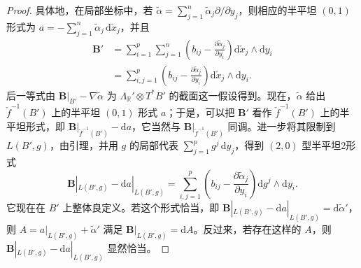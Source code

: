 \begin{proof}
具体地，在局部坐标中，若 $\widetilde\alpha=\sum_{j=1}^n\widetilde\alpha_j\partial/\partial y_j$，则相应的半平坦 $(0,1)$ 形式为 $a=-\sum_{j=1}^n\widetilde\alpha_j\,\mathrm d\check x_j$，并且
\begin{equation}\label{eq:6.4}
\begin{aligned}
\mathbf B'
&=\sum_{i=1}^p\sum_{j=1}^n
\left(b_{ij}-\frac{\partial\widetilde\alpha_j}{\partial y_i}\right)
\mathrm d\check x_j\wedge\mathrm dy_i\\
&=\sum_{i,j=1}^p
\left(b_{ij}-\frac{\partial\widetilde\alpha_j}{\partial y_i}\right)
\mathrm d\check x_j\wedge\mathrm dy_i.
\end{aligned}
\end{equation}
后一等式由 $\mathbf B|_{B'}-\nabla\widetilde\alpha$ 为 $\Lambda_{\mathbb R}'\otimes T^*B'$ 的截面这一假设得到。现在，$\widetilde\alpha$ 给出 $\check f^{-1}(B')$ 上的半平坦 $(0,1)$ 形式 $a$；于是，可以把 $\mathbf B'$ 看作 $\check f^{-1}(B')$ 上的半平坦形式，即 $\mathbf B|_{\check f^{-1}(B')}-\mathrm da$，它当然与 $\mathbf B|_{\check f^{-1}(B')}$ 同调。进一步将其限制到 $L(B',g)$，由引理，并用 $g$ 的局部代表 $\sum_{j=1}^pg^j\,\mathrm dy_j$，得到 $(2,0)$ 型半平坦2形式
\[
\mathbf B|_{L(B',g)}-\mathrm da|_{L(B',g)}
=\sum_{i,j=1}^p
\left(b_{ij}-\frac{\partial\widetilde\alpha_j}{\partial y_i}\right)
\mathrm dg^j\wedge\mathrm dy_i.
\]
它现在在 $B'$ 上整体良定义。若这个形式恰当，即 $\mathbf B|_{L(B',g)}-\mathrm da|_{L(B',g)}=\mathrm d\widetilde\alpha'$，则 $A=a|_{L(B',g)}+\widetilde\alpha'$ 满足 $\mathbf B|_{L(B',g)}=\mathrm dA$。反过来，若存在这样的 $A$，则 $\mathbf B|_{L(B',g)}-\mathrm da|_{L(B',g)}$ 显然恰当。


\end{proof}
